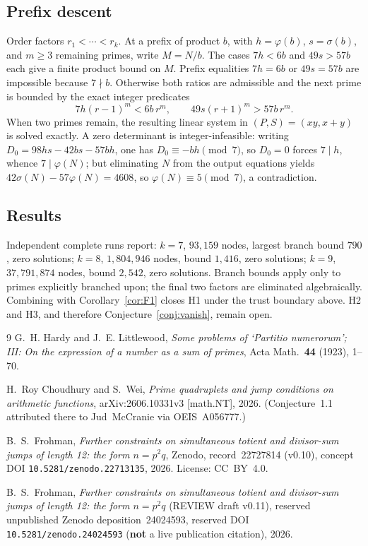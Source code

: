 \documentclass[11pt,reqno]{amsart}
\newcommand{\ph}{\varphi}
\newcommand{\sig}{\sigma}
\theoremstyle{definition}
\begin{document}
\subsection*{Prefix descent}
Order factors \(r_1<\cdots<r_k\). At a prefix of product \(b\), with \(h=\ph(b)\), \(s=\sig(b)\), and \(m\ge 3\) remaining primes, write \(M=N/b\). The cases \(7h<6b\) and \(49s>57b\) each give a finite product bound on \(M\). Prefix equalities \(7h=6b\) or \(49s=57b\) are impossible because \(7\nmid b\). Otherwise both ratios are admissible and the next prime is bounded by the exact integer predicates
\[
7h(r-1)^m<6b\,r^m,\qquad 49s(r+1)^m>57b\,r^m.
\]
When two primes remain, the resulting linear system in \((P,S)=(xy,x+y)\) is solved exactly. A zero determinant is integer-infeasible: writing \(D_0=98hs-42bs-57bh\), one has \(D_0\equiv -bh\pmod 7\), so \(D_0=0\) forces \(7\mid h\), whence \(7\mid\ph(N)\); but eliminating \(N\) from the output equations yields \(42\sig(N)-57\ph(N)=4608\), so \(\ph(N)\equiv 5\pmod 7\), a contradiction.

\subsection*{Results}
Independent complete runs report: \(k=7\), \(93{,}159\) nodes, largest branch bound \(790\), zero solutions; \(k=8\), \(1{,}804{,}946\) nodes, bound \(1{,}416\), zero solutions; \(k=9\), \(37{,}791{,}874\) nodes, bound \(2{,}542\), zero solutions. Branch bounds apply only to primes explicitly branched upon; the final two factors are eliminated algebraically. Combining with Corollary~\ref{cor:F1} closes H1 under the trust boundary above. H2 and H3, and therefore Conjecture~\ref{conj:vanish}, remain open.


\begin{thebibliography}{9}
G.~H. Hardy and J.~E. Littlewood,
\textit{Some problems of `Partitio numerorum'; III: On the expression of a number as a sum of primes},
Acta Math.\ \textbf{44} (1923), 1--70.

H.~Roy Choudhury and S.~Wei,
\textit{Prime quadruplets and jump conditions on arithmetic functions},
arXiv:2606.10331v3 [math.NT], 2026.
(Conjecture~1.1 attributed there to Jud~McCranie via OEIS~A056777.)

B.~S.~Frohman,
\textit{Further constraints on simultaneous totient and divisor-sum jumps of length 12: the form \(n=p^2q\)},
Zenodo, record~22727814 (v0.10), concept DOI \texttt{10.5281/zenodo.22713135}, 2026.
License: CC~BY~4.0.

B.~S.~Frohman,
\textit{Further constraints on simultaneous totient and divisor-sum jumps of length 12: the form \(n=p^2q\)} (REVIEW draft v0.11),
reserved unpublished Zenodo deposition~24024593, reserved DOI \texttt{10.5281/zenodo.24024593} (\textbf{not} a live publication citation), 2026.
\end{thebibliography}
\end{document}
